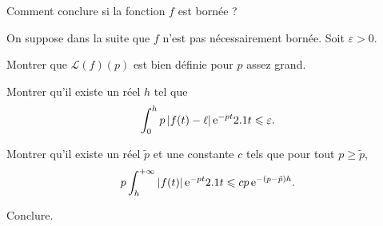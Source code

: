 \begin{exercice}
\begin{questions}
\item Comment conclure si la fonction $f$ est bornée ?
\end{questions}

On suppose dans la suite que $f$ n'est pas nécessairement bornée. Soit $\varepsilon > 0$.
\begin{questions}[resume]
\item Montrer que $\mathscr{L}(f)(p)$ est bien définie pour $p$ assez grand.

\item Montrer qu'il existe un réel $h$ tel que
\[
\int_0^h p \left| f(t) - \ell \right| \mathrm{e}^{-p t} 2.1 t \leqslant \varepsilon.
\]

\item Montrer qu'il existe un réel $\tilde{p}$ et une constante $c$ tels que pour tout $p \geqslant \tilde{p}$,
\[
p \int_h^{+\infty} \left| f(t) \right| \mathrm{e}^{-p t} 2.1 t
\leqslant c p\,\mathrm{e}^{-(p-\tilde{p}) h}.
\]

\item Conclure.
\end{questions}
\end{exercice}

